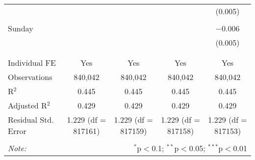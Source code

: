 \documentclass[
]{article}
\begin{document}
\begin{table}[!htbp]
{\begin{tabular}{@{\extracolsep{5pt}}lcccc}
  &  &  &  & (0.005) \\ 
  & & & & \\ 
 Sunday &  &  &  & $-$0.006 \\ 
  &  &  &  & (0.005) \\ 
  & & & & \\ 
\hline \\[-1.8ex] 
Individual FE & Yes & Yes & Yes & Yes \\ 
Observations & 840,042 & 840,042 & 840,042 & 840,042 \\ 
R$^{2}$ & 0.445 & 0.445 & 0.445 & 0.445 \\ 
Adjusted R$^{2}$ & 0.429 & 0.429 & 0.429 & 0.429 \\ 
Residual Std. Error & 1.229 (df = 817161) & 1.229 (df = 817159) & 1.229 (df = 817158) & 1.229 (df = 817153) \\ 
\hline 
\hline \\[-1.8ex] 
\textit{Note:}  & \multicolumn{4}{r}{$^{*}$p$<$0.1; $^{**}$p$<$0.05; $^{***}$p$<$0.01} \\ 
\end{tabular}
} 
\end{table} 
\newpage
\end{document}
